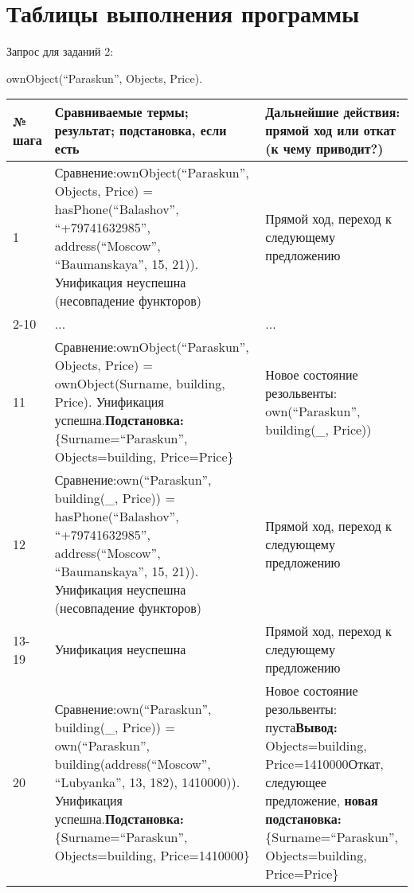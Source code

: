 \documentclass[14pt,a4paper]{scrreprt}
\begin{document}
\section{Таблицы выполнения программы}

Запрос для заданий 2:

ownObject(``Paraskun'', Objects, Price).

\begin{table}[H]
	\begin{tabular}{|p{1.2cm\small}|p{9cm\small}|p{5cm\small}|}	
		\hline
		№ шага & Сравниваемые термы; результат; подстановка, если есть & Дальнейшие действия: прямой ход или откат (к чему приводит?)\\
		\hline
		1 & Сравнение:\linebreak ownObject(``Paraskun'', Objects, Price) = hasPhone(``Balashov'', ``+79741632985'', address(``Moscow'', ``Baumanskaya'', 15, 21)). Унификация неуспешна (несовпадение функторов) & Прямой ход, переход к следующему предложению\\
		\hline
		2-10 & ... & ...\\
		\hline
		11 & Сравнение:\linebreak ownObject(``Paraskun'', Objects, Price) = ownObject(Surname, building, Price). Унификация успешна.\linebreak \textbf{Подстановка:} \{Surname=``Paraskun'', Objects=building, Price=Price\} & Новое состояние резольвенты: own(``Paraskun'', building(\_, Price))\\
		\hline
		12 & Сравнение:\linebreak own(``Paraskun'', building(\_, Price)) = hasPhone(``Balashov'', ``+79741632985'', address(``Moscow'', ``Baumanskaya'', 15, 21)). Унификация неуспешна (несовпадение функторов) & Прямой ход, переход к следующему предложению\\
		\hline
		13-19 & Унификация неуспешна & Прямой ход, переход к следующему предложению\\
		\hline
		20 & Сравнение:\linebreak own(``Paraskun'', building(\_, Price)) = own(``Paraskun'', building(address(``Moscow'', ``Lubyanka'', 13, 182), 1410000)). Унификация успешна.\linebreak \textbf{Подстановка:} \{Surname=``Paraskun'', Objects=building, Price=1410000\} & Новое состояние резольвенты: пуста\linebreak \textbf{Вывод:} Objects=building, Price=1410000\linebreak Откат, следующее предложение, \textbf{новая подстановка:} \{Surname=``Paraskun'', Objects=building, Price=Price\}\\

\end{tabular}
\end{table}
\end{document}
